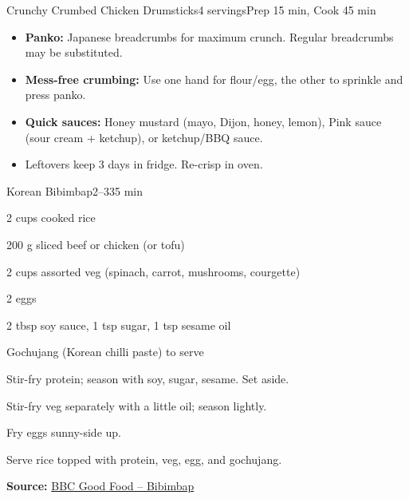 \begin{recipebox}{Crunchy Crumbed Chicken Drumsticks}{4 servings}{Prep 15 min, Cook 45 min}
\begin{notes}
\begin{itemize}
  \item \textbf{Panko:} Japanese breadcrumbs for maximum crunch. Regular breadcrumbs may be substituted.
  \item \textbf{Mess-free crumbing:} Use one hand for flour/egg, the other to sprinkle and press panko.
  \item \textbf{Quick sauces:} Honey mustard (mayo, Dijon, honey, lemon), Pink sauce (sour cream + ketchup), or ketchup/BBQ sauce.
  \item Leftovers keep 3 days in fridge. Re-crisp in oven.
\end{itemize}
\end{notes}
\end{recipebox}


\begin{recipebox}{Korean Bibimbap}{2--3}{35 min}
\begin{ingredients}
  \item 2 cups cooked rice
  \item 200 g sliced beef or chicken (or tofu)
  \item 2 cups assorted veg (spinach, carrot, mushrooms, courgette)
  \item 2 eggs
  \item 2 tbsp soy sauce, 1 tsp sugar, 1 tsp sesame oil
  \item Gochujang (Korean chilli paste) to serve
\end{ingredients}
\begin{method}
  \item Stir-fry protein; season with soy, sugar, sesame. Set aside.
  \item Stir-fry veg separately with a little oil; season lightly.
  \item Fry eggs sunny-side up.
  \item Serve rice topped with protein, veg, egg, and gochujang.
\end{method}
\textbf{Source:} \href{https://www.bbcgoodfood.com/recipes/bibimbap}{BBC Good Food – Bibimbap}
\end{recipebox}

